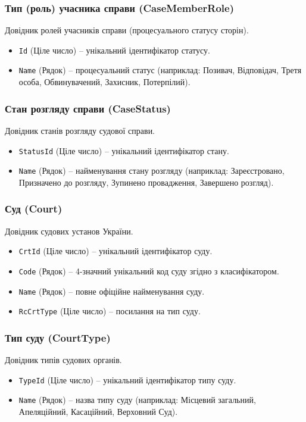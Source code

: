 \documentclass{article}
\begin{document}
\subsubsection{Тип (роль) учасника справи (CaseMemberRole)}
Довідник ролей учасників справи (процесуального статусу сторін).
\begin{itemize}
    \item \texttt{Id} (Ціле число) -- унікальний ідентифікатор статусу.
    \item \texttt{Name} (Рядок) -- процесуальний статус (наприклад: Позивач, Відповідач, Третя особа, Обвинувачений, Захисник, Потерпілий).
\end{itemize}

\subsubsection{Стан розгляду справи (CaseStatus)}
Довідник станів розгляду судової справи.
\begin{itemize}
    \item \texttt{StatusId} (Ціле число) -- унікальний ідентифікатор стану.
    \item \texttt{Name} (Рядок) -- найменування стану розгляду (наприклад: Зареєстровано, Призначено до розгляду, Зупинено провадження, Завершено розгляд).
\end{itemize}

\subsubsection{Суд (Court)}
Довідник судових установ України.
\begin{itemize}
    \item \texttt{CrtId} (Ціле число) -- унікальний ідентифікатор суду.
    \item \texttt{Code} (Рядок) -- 4-значний унікальний код суду згідно з класифікатором.
    \item \texttt{Name} (Рядок) -- повне офіційне найменування суду.
    \item \texttt{RcCrtType} (Ціле число) -- посилання на тип суду.
\end{itemize}

\subsubsection{Тип суду (CourtType)}
Довідник типів судових органів.
\begin{itemize}
    \item \texttt{TypeId} (Ціле число) -- унікальний ідентифікатор типу суду.
    \item \texttt{Name} (Рядок) -- назва типу суду (наприклад: Місцевий загальний, Апеляційний, Касаційний, Верховний Суд).
\end{itemize}
\end{document}
